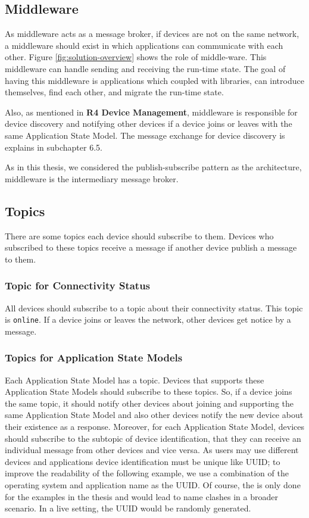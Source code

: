 \subsection{Middleware}
As middleware acts as a message broker, if devices are not on the same network, a middleware should exist in which applications can communicate with each other. Figure \ref{fig:solution-overview} shows the role of middle-ware.
This middleware can handle sending and receiving the run-time state.
The goal of having this middleware is applications which coupled with
libraries, can introduce themselves, find each other, and migrate the run-time state.

Also, as mentioned in \textbf{R4 Device Management}, middleware is responsible for device discovery and notifying other devices if a device joins or leaves with the same Application State Model. The message exchange for device discovery is explains in subchapter 6.5.

As in this thesis, we considered the publish-subscribe pattern as the architecture, middleware is the intermediary message broker.

\subsection{Topics}
There are some topics each device should subscribe to them. Devices who subscribed to these topics receive a message if another device publish a message to them.

\subsubsection{Topic for Connectivity Status}
All devices should subscribe to a topic about their connectivity status. This topic is \lstinline[basicstyle=\ttfamily]{online}. If a device joins or leaves the network, other devices get notice by a message.

\subsubsection{Topics for Application State Models}
Each Application State Model has a topic. Devices that supports these Application State Models should subscribe to these topics. So, if a device joins the same topic, it should notify other devices about joining and supporting the same Application State Model and also other devices notify the new device about their existence as a response. Moreover, for each Application State Model, devices should subscribe to the subtopic of device identification, that they can receive an individual message from other devices and vice versa. As users may use different devices and applications device identification must be unique like UUID; to improve the readability of the following example, we use a combination of the operating system and application name as the UUID. Of course, the is only done for the examples in the thesis and would lead to name clashes in a broader scenario. In a live setting, the UUID would be randomly generated.



